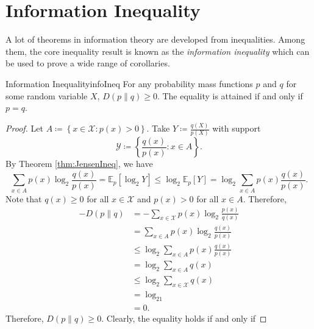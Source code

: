 \documentclass[math, code]{amznotes}
\theoremstyle{remark}
\begin{document}
\section{Information Inequality}
A lot of theorems in information theory are developed from inequalities. Among them, the core inequality result is known as the \textit{information inequality} which can be used to prove a wide range of corollaries.
\begin{thmbox}{Information Inequality}{infoIneq}
    For any probability mass functions $p$ and $q$ for some random variable $X$, $D\left(p \parallel q\right) \geq 0$. The equality is attained if and only if $p = q$.
    \tcblower
    \begin{proof}
        Let $A \coloneqq \left\{x \in \mathcal{X} \colon p\left(x\right) > 0\right\}$. Take $Y \coloneqq \frac{q\left(X\right)}{p\left(X\right)}$ with support 
        \begin{equation*}
            \mathcal{Y} \coloneqq \left\{\frac{q\left(x\right)}{p\left(x\right)} \colon x \in A\right\}.
        \end{equation*}
        By Theorem \ref{thm:JensenIneq}, we have 
        \begin{equation*}
            \sum_{x \in A}p\left(x\right)\log_2\frac{q\left(x\right)}{p\left(x\right)} = \mathbb{E}_p\left[\log_2Y\right] \leq \log_2\mathbb{E}_p\left[Y\right] = \log_2\sum_{x \in A}p\left(x\right)\frac{q\left(x\right)}{p\left(x\right)}.
        \end{equation*}
        Note that $q\left(x\right) \geq 0$ for all $x \in \mathcal{X}$ and $p\left(x\right) > 0$ for all $x \in A$. Therefore, 
        \begin{align*}
            -D\left(p \parallel q\right) & = -\sum_{x \in \mathcal{X}}p\left(x\right)\log_2\frac{p\left(x\right)}{q\left(x\right)} \\
            & = \sum_{x \in A}p\left(x\right)\log_2\frac{q\left(x\right)}{p\left(x\right)} \\
            & \leq \log_2\sum_{x \in A}p\left(x\right)\frac{q\left(x\right)}{p\left(x\right)} \\
            & = \log_2\sum_{x \in A}q\left(x\right) \\
            & \leq \log_2\sum_{x \in \mathcal{X}}q\left(x\right) \\
            & = \log_21 \\
            & = 0.
        \end{align*}
        Therefore, $D\left(p \parallel q\right) \geq 0$. Clearly, the equality holds if and only if 

\end{proof}
\end{thmbox}
\end{document}
